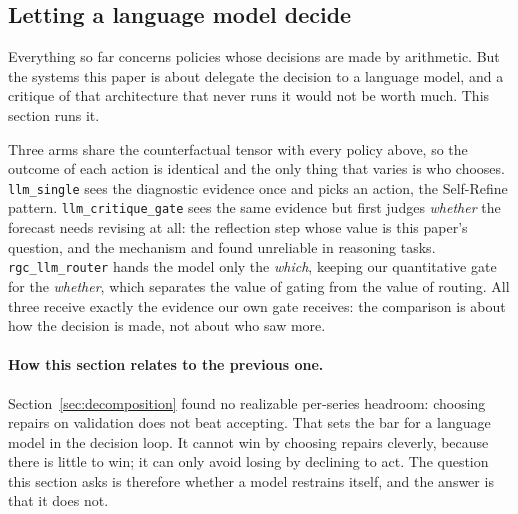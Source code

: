 \subsection{Letting a language model decide}
\label{sec:llmarms}

Everything so far concerns policies whose decisions are made by arithmetic. But the
systems this paper is about delegate the decision to a language model, and a critique of
that architecture that never runs it would not be worth much. This section runs it.

Three arms share the counterfactual tensor with every policy above, so the outcome of
each action is identical and the only thing that varies is who chooses.
\texttt{llm\_single} sees the diagnostic evidence once and picks an action, the
Self-Refine pattern. \texttt{llm\_critique\_gate} sees the same evidence but first judges
\emph{whether} the forecast needs revising at all: the reflection step whose value is
this paper's question, and the mechanism \citet{huang2024selfcorrect} and
\citet{kamoi2024selfcorrect} found unreliable in reasoning tasks.
\texttt{rgc\_llm\_router} hands the model only the \emph{which}, keeping our quantitative
gate for the \emph{whether}, which separates the value of gating from the value of
routing. All three receive exactly the evidence our own gate receives: the comparison is
about how the decision is made, not about who saw more.

\paragraph{How this section relates to the previous one.}
Section~\ref{sec:decomposition} found no realizable per-series headroom: choosing
repairs on validation does not beat accepting. That sets the bar for a language model
in the decision loop. It cannot win by choosing repairs cleverly, because there is
little to win; it can only avoid losing by declining to act. The question this section
asks is therefore whether a model restrains itself, and the answer is that it does not.


